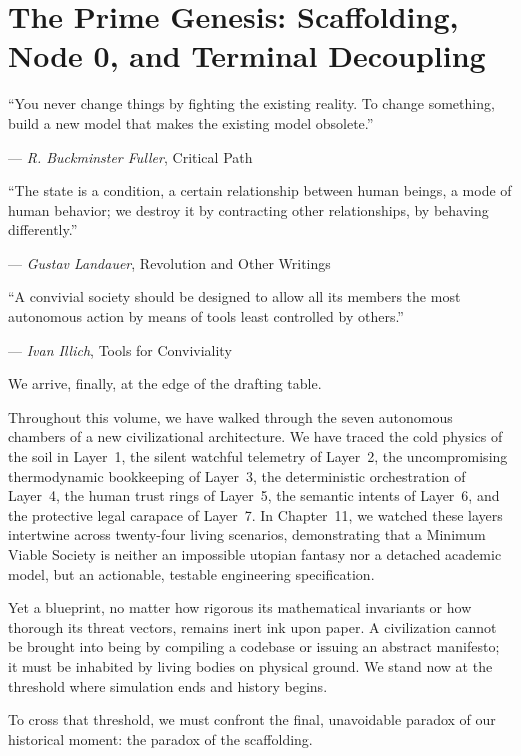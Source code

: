 \chapter[The Prime Genesis]{The Prime Genesis: Scaffolding, Node 0, and Terminal Decoupling}
\label{chap:prime_genesis}

\epigraph{
    ``You never change things by fighting the existing reality. To change something, build a new model that makes the existing model obsolete.''
}{--- \textit{R. Buckminster Fuller}, \textnormal{Critical Path} \parencite{fuller1981}}

\epigraph{
    ``The state is a condition, a certain relationship between human beings, a mode of human behavior; we destroy it by contracting other relationships, by behaving differently.''
}{--- \textit{Gustav Landauer}, \textnormal{Revolution and Other Writings} \parencite{landauer2010}}

\epigraph{
    ``A convivial society should be designed to allow all its members the most autonomous action by means of tools least controlled by others.''
}{--- \textit{Ivan Illich}, \textnormal{Tools for Conviviality} \parencite{illich1973}}

We arrive, finally, at the edge of the drafting table.

Throughout this volume, we have walked through the seven autonomous chambers of a new civilizational architecture. We have traced the cold physics of the soil in Layer~1, the silent watchful telemetry of Layer~2, the uncompromising thermodynamic bookkeeping of Layer~3, the deterministic orchestration of Layer~4, the human trust rings of Layer~5, the semantic intents of Layer~6, and the protective legal carapace of Layer~7. In Chapter~11, we watched these layers intertwine across twenty-four living scenarios, demonstrating that a Minimum Viable Society is neither an impossible utopian fantasy nor a detached academic model, but an actionable, testable engineering specification.

Yet a blueprint, no matter how rigorous its mathematical invariants or how thorough its threat vectors, remains inert ink upon paper. A civilization cannot be brought into being by compiling a codebase or issuing an abstract manifesto; it must be inhabited by living bodies on physical ground. We stand now at the threshold where simulation ends and history begins.

To cross that threshold, we must confront the final, unavoidable paradox of our historical moment: the paradox of the scaffolding.

